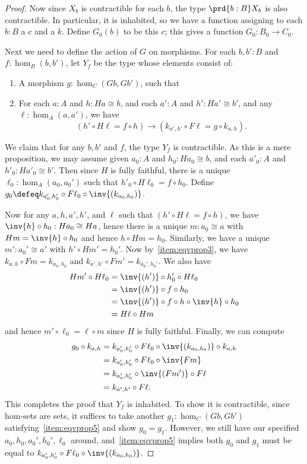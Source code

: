 \begin{proof}
  Now since $X_b$ is contractible for each $b$, the type $\prd{b:B} X_b$ is also contractible.
  In particular, it is inhabited, so we have a function assigning to each $b:B$ a $c$ and a $k$.
  Define $G_0(b)$ to be this $c$; this gives a function $G_0 :B_0 \to C_0$.

  Next we need to define the action of $G$ on morphisms.
  For each $b,b':B$ and $f:\hom_B(b,b')$, let $Y_f$ be the type whose elements consist of:
  \begin{enumerate}[resume]
  \item A morphism $g:\hom_C(Gb,Gb')$, such that
  \item For each $a:A$ and $h:Ha\cong b$, and each $a':A$ and $h':Ha'\cong b'$, and any $\ell:\hom_A(a,a')$, we have\label{item:eqvprop5}
    \[ (h' \circ H\ell = f \circ h)
    \to
    (k_{a',h'} \circ F\ell = g\circ k_{a,h}). \]
  \end{enumerate}
  We claim that for any $b,b'$ and $f$, the type $Y_f$ is contractible.
  As this is a mere proposition, we may assume given $a_0:A$ and $h_0:Ha_0\cong b$, and each $a'_0:A$ and $h'_0:Ha'_0\cong b'$.
  Then since $H$ is fully faithful, there is a unique $\ell_0:\hom_A(a_0,a_0')$ such that $h'_0 \circ H\ell_0 = f \circ h_0$.
  Define $g_0 \defeq k_{a_0',h_0'} \circ F \ell_0 \circ \inv{(k_{a_0,h_0})}$.

  Now for any $a,h,a',h'$, and $\ell$ such that $(h' \circ H\ell = f \circ h)$, we have $\inv{h}\circ h_0:Ha_0\cong Ha$, hence there is a unique $m:a_0\cong a$ with $Hm = \inv{h}\circ h_0$ and hence $h\circ Hm = h_0$.
  Similarly, we have a unique $m':a_0'\cong a'$ with $h'\circ Hm' = h_0'$.
  Now by~\ref{item:eqvprop3}, we have $k_{a,h}\circ Fm = k_{a_0,h_0}$ and $k_{a',h'}\circ Fm' = k_{a_0',h_0'}$.
  We also have
  \begin{align*}
    Hm' \circ H\ell_0
    &= \inv{(h')} \circ h_0' \circ H\ell_0\\
    &= \inv{(h')} \circ f \circ h_0\\
    &= \inv{(h')} \circ f \circ h \circ \inv{h} \circ h_0\\
    &= H\ell \circ Hm
  \end{align*}
  and hence $m'\circ \ell_0 = \ell\circ m$ since $H$ is fully faithful.
  Finally, we can compute
  \begin{align*}
    g_0 \circ k_{a,h}
    &= k_{a_0',h_0'} \circ F \ell_0 \circ \inv{(k_{a_0,h_0})} \circ k_{a,h}\\
    &= k_{a_0',h_0'} \circ F \ell_0 \circ \inv{Fm}\\
    &= k_{a_0',h_0'} \circ \inv{(Fm')} \circ F\ell\\
    &= k_{a',h'}\circ F\ell.
  \end{align*}
  This completes the proof that $Y_f$ is inhabited.
  To show it is contractible, since hom-sets are sets, it suffices to take another $g_1:\hom_C(Gb,Gb')$ satisfying~\ref{item:eqvprop5} and show $g_0=g_1$.
  However, we still have our specified $a_0,h_0,a_0',h_0',\ell_0$ around, and~\ref{item:eqvprop5} implies both $g_0$ and $g_1$ must be equal to $k_{a_0',h_0'} \circ F \ell_0 \circ \inv{(k_{a_0,h_0})}$.


\end{proof}
